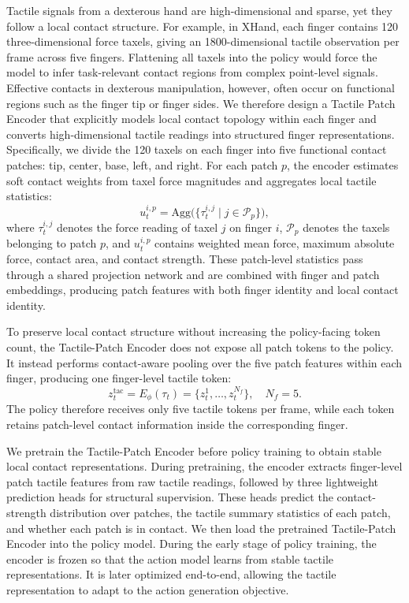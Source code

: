 Tactile signals from a dexterous hand are high-dimensional and sparse, yet they follow a local contact structure. For example, in XHand, each finger contains 120 three-dimensional force taxels, giving an 1800-dimensional tactile observation per frame across five fingers. Flattening all taxels into the policy would force the model to infer task-relevant contact regions from complex point-level signals. Effective contacts in dexterous manipulation, however, often occur on functional regions such as the finger tip or finger sides. We therefore design a Tactile Patch Encoder that explicitly models local contact topology within each finger and converts high-dimensional tactile readings into structured finger representations. Specifically, we divide the 120 taxels on each finger into five functional contact patches: tip, center, base, left, and right. For each patch \(p\), the encoder estimates soft contact weights from taxel force magnitudes and aggregates local tactile statistics:
\begin{equation}
    u_{t}^{i,p}
    =
    \mathrm{Agg}
    \big(\{\tau_{t}^{i,j} \mid j \in \mathcal{P}_{p}\}\big),
\end{equation}
where \(\tau_{t}^{i,j}\) denotes the force reading of taxel \(j\) on finger \(i\), \(\mathcal{P}_{p}\) denotes the taxels belonging to patch \(p\), and \(u_{t}^{i,p}\) contains weighted mean force, maximum absolute force, contact area, and contact strength. These patch-level statistics pass through a shared projection network and are combined with finger and patch embeddings, producing patch features with both finger identity and local contact identity.

To preserve local contact structure without increasing the policy-facing token count, the Tactile-Patch Encoder does not expose all patch tokens to the policy. It instead performs contact-aware pooling over the five patch features within each finger, producing one finger-level tactile token:
\begin{equation}
    z_t^{\mathrm{tac}}
    =
    E_{\phi}(\tau_t)
    =
    \{z_t^1,\ldots,z_t^{N_f}\}, \quad N_f=5 .
\end{equation}
The policy therefore receives only five tactile tokens per frame, while each token retains patch-level contact information inside the corresponding finger.

We pretrain the Tactile-Patch Encoder before policy training to obtain stable local contact representations. During pretraining, the encoder extracts finger-level patch tactile features from raw tactile readings, followed by three lightweight prediction heads for structural supervision. These heads predict the contact-strength distribution over patches, the tactile summary statistics of each patch, and whether each patch is in contact. We then load the pretrained Tactile-Patch Encoder into the policy model. During the early stage of policy training, the encoder is frozen so that the action model learns from stable tactile representations. It is later optimized end-to-end, allowing the tactile representation to adapt to the action generation objective.

